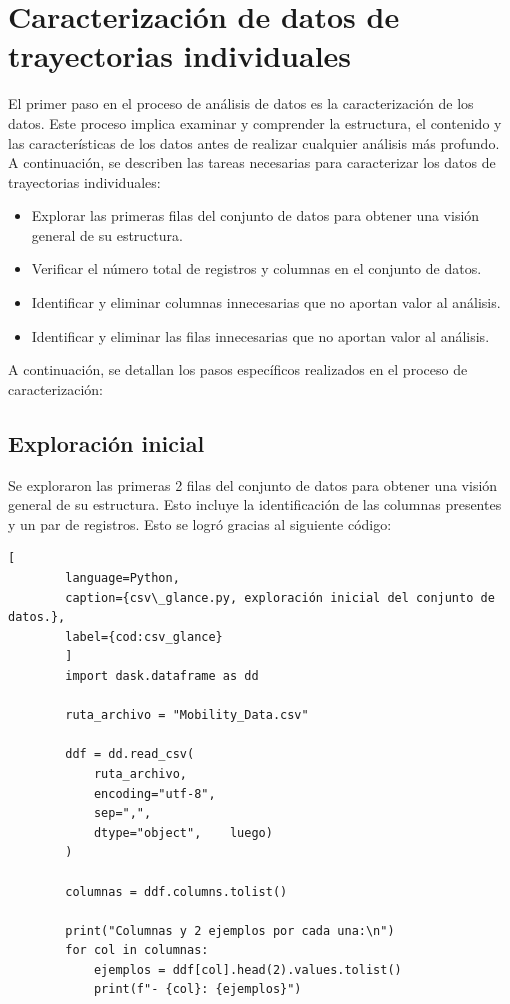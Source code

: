\section{Caracterización de datos de trayectorias individuales}
El primer paso en el proceso de análisis de datos es la caracterización de los datos. Este proceso implica examinar y comprender la estructura, el contenido y las características de los datos antes de realizar cualquier análisis más profundo. A continuación, se describen las tareas necesarias para caracterizar los datos de trayectorias individuales:
\begin{itemize}
    \item Explorar las primeras filas del conjunto de datos para obtener una visión general de su estructura.
    \item Verificar el número total de registros y columnas en el conjunto de datos.
    \item Identificar y eliminar columnas innecesarias que no aportan valor al análisis.
    \item Identificar y eliminar las filas innecesarias que no aportan valor al análisis.
\end{itemize}
A continuación, se detallan los pasos específicos realizados en el proceso de caracterización:

\subsection{Exploración inicial}
Se exploraron las primeras 2 filas del conjunto de datos para obtener una visión general de su estructura. Esto incluye la identificación de las columnas presentes y un par de registros. Esto se logró gracias al siguiente código:

    \begin{lstlisting}[
        language=Python,
        caption={csv\_glance.py, exploración inicial del conjunto de datos.},
        label={cod:csv_glance}
        ]
        import dask.dataframe as dd

        ruta_archivo = "Mobility_Data.csv"  

        ddf = dd.read_csv(
            ruta_archivo,
            encoding="utf-8",  
            sep=",",          
            dtype="object",    luego)
        )

        columnas = ddf.columns.tolist()

        print("Columnas y 2 ejemplos por cada una:\n")
        for col in columnas:
            ejemplos = ddf[col].head(2).values.tolist() 
            print(f"- {col}: {ejemplos}")
    \end{lstlisting}

